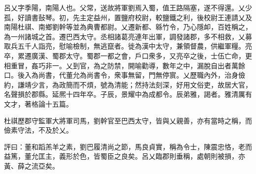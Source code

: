 
\begin{pinyinscope}
呂乂字季陽，南陽人也。父常，送故將軍劉焉入蜀，值王路隔塞，遂不得還。乂少孤，好讀書鼔琴。初，先主定益州，置鹽府校尉，較鹽鐵之利，後校尉王連請乂及南陽杜祺、南鄉劉幹等並為典曹都尉。乂遷新都、緜竹令，乃心隱卹，百姓稱之，為一州諸城之首。遷巴西太守。丞相諸葛亮連年出軍，調發諸郡，多不相救，乂募取兵五千人詣亮，慰喻檢制，無逃竄者。徙為漢中太守，兼領督農，供繼軍糧。亮卒，累遷廣漢、蜀郡太守。蜀郡一都之會，戶口衆多，又亮卒之後，士伍亡命，更相重冒，姦巧非一。乂到官，為之防禁，開喻勸導，數年之中，漏脫自出者萬餘口。後入為尚書，代董允為尚書令，衆事無留，門無停賔。乂歷職內外，治身儉約，謙靖少言，為政簡而不煩，號為清能；然持法刻深，好用文俗吏，故居大官，名聲損於郡縣。延熈十四年卒。子辰，景耀中為成都令。辰弟雅，謁者。雅清厲有文才，著格論十五篇。

杜祺歷郡守監軍大將軍司馬，劉幹官至巴西太守，皆與乂親善，亦有當時之稱，而儉素守法，不及於乂。

評曰：董和蹈羔羊之素，劉巴履清尚之節，馬良貞實，稱為令士，陳震忠恪，老而益篤，董允匡主，義形於色，皆蜀臣之良矣。呂乂臨郡則垂稱，處朝則被損，亦黃、薛之流亞矣。


\end{pinyinscope}